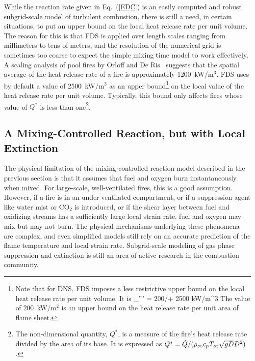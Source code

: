 While the reaction rate given in Eq.~(\ref{EDC}) is an easily computed and robust subgrid-scale model of
turbulent combustion, there is still a need, in certain situations, to put an upper bound on the local heat release rate per unit volume. The reason for
this is that FDS is applied over length scales ranging from millimeters to tens of meters, and the resolution of the numerical grid
is sometimes too coarse to expect the simple mixing time model to work effectively.
A scaling analysis of pool fires by Orloff and De Ris~\cite{Orloff:19th_Symposium} suggests that the spatial average of the
heat release rate of a fire is approximately 1200~kW/m$^3$. FDS uses by default a value of 2500~kW/m$^3$ as an upper bound\footnote{Note that
for DNS, FDS imposes a less restrictive upper bound on the local heat release rate per unit volume. It is
\be \dq_{\max}''' = 200/\dx + 2500 \quad \hbox{kW/m}^3 \ee
The value of 200~kW/m$^2$ is an upper bound on the heat release rate per unit area of flame sheet.}
on the local value of the heat release rate per unit volume. Typically, this bound only affects fires whose value of $Q^*$
is less than one\footnote{The non-dimensional quantity, $Q^*$, is a measure of the fire's heat release rate divided by the
area of its base. It is expressed as $Q^*=\dot{Q}/(\rho_\infty c_p T_\infty \sqrt{g D} D^2)$.}.

\subsection{A Mixing-Controlled Reaction, but with Local Extinction}

\label{extinction}

The physical limitation of the mixing-controlled reaction model described in the previous section is that it assumes that fuel and oxygen burn instantaneously when mixed. For large-scale, well-ventilated
fires, this is a good assumption. However, if a fire is in an
under-ventilated compartment, or if a suppression agent like water
mist or CO$_2$ is introduced, or if the shear layer between fuel and oxidizing streams
has a sufficiently large local strain rate,
fuel and oxygen may mix but may not burn.
The physical mechanisms underlying these phenomena are complex, and
even simplified models still rely on an accurate prediction
of the flame temperature and local strain rate.
Subgrid-scale modeling of gas phase suppression and
extinction is still an area of active research in the combustion
community.


